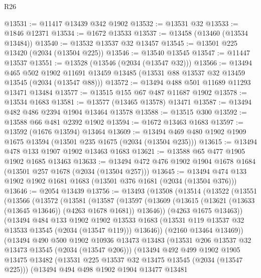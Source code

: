 \begin{lexlean}{R26}
\begin{coremodule}
@13531 := @11417 @13439 @342 @1902
@13532 := @13531 @32
@13533 := @1846 @12371
@13534 := @1672 @13533
@13537 := @13458 (@13460 (@13534 @13484))
@13540 := @13532 @13537 @32 @13457
@13545 := @13501 @225 @13420 (@2034 (@13504 @225))
@13546 := @13540 @13545
@13547 := @11447 @13537
@13551 := @13528 (@13546 (@2034 (@13547 @32)))
@13566 := @13494
    @465
    @502
    @1902
    @11691
    @13459
    @13485
    (@13531 @88 @13537 @32 @13459 @13545 (@2034 (@13547 @88)))
@13572 := @13494 @488 @501 @11689 @11293 @13471 @13484
@13577 := @13515 @155 @67 @487 @11687 @1902
@13578 := @13534 @1683
@13581 := @13577 (@13465 @13578) @13471
@13587 := @13494 @482 @486 @2394 @1904 @13464 @13578
@13588 := @13515 @300
@13592 := @13588 @66 @481 @2392 @1902
@13594 := @1672 @13463 @1683
@13597 := @13592 (@1676 @13594) @13464
@13609 := @13494 @469 @480 @1902 @1909 @1675 @13594 (@13501 @235 @1675 (@2034 (@13504 @235)))
@13615 := @13494 @478 @133 @1907 @1902 @13463 @1683
@13621 := @13588 @65 @477 @1905 @1902 @1685 @13463
@13633 := @13494 @472 @476 @1902 @1904 @1678 @1684 (@13501 @257 @1678 (@2034 (@13504 @257)))
@13645 := @13494 @474 @133 @1902 @1902 @1681 @1683 (@13501 @376 @1681 (@2034 (@13504 @376)))
@13646 := @2054 @13439
@13756 := @13493
    (@13508
      (@13514
        (@13522
          (@13551
            (@13566
              (@13572
                (@13581
                  (@13587
                    (@13597
                      (@13609 (@13615 (@13621 (@13633 (@13645 @13646)) (@4263 @1678 @1681)) @13646))
                      (@4263 @1675 @13463))
                    (@13494
                      @484
                      @133
                      @1902
                      @1902
                      @13533
                      @1683
                      (@13531 @119 @13537 @32 @13533 @13545 (@2034 (@13547 @119)))
                      @13646))
                  (@2160 @13464 @13469))
                (@13494
                  @490
                  @500
                  @1902
                  @10936
                  @13473
                  @13483
                  (@13531 @206 @13537 @32 @13473 @13545 (@2034 (@13547 @206)))
                  (@13494
                    @492
                    @499
                    @1902
                    @1905
                    @13475
                    @13482
                    (@13531 @225 @13537 @32 @13475 @13545 (@2034 (@13547 @225)))
                    (@13494
                      @494
                      @498
                      @1902
                      @1904
                      @13477
                      @13481

\end{coremodule}
\end{lexlean}
